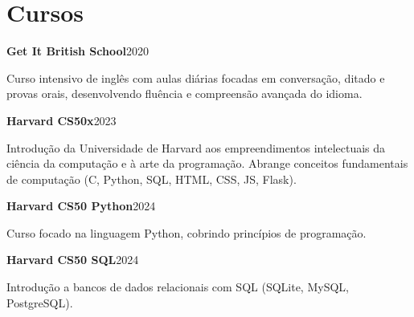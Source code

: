 
\iffalse
\section{Cursos}
    \resumeSubHeadingListStart

    \resumeProjectHeading
    {\textbf{Get It British School}}{2020}
    Curso intensivo de inglˆes com aulas diˊarias focadas em conversação, ditado e provas orais, desenvolvendo fluência e compreensão avanc¸ada do idioma.
    
    \resumeProjectHeading
    {\textbf{Harvard CS50x}}{2023}

    Introdução da Universidade de Harvard aos empreendimentos intelectuais da ciência da computação e à arte da programação. Abrange conceitos fundamentais, como algoritimos, estrutura de dados, gerenciamento de memória e desenvolvimento web (C, Python, SQL, HTML, CSS, JS, Flask).

    \resumeProjectHeading
    {\textbf{Harvard CS50 Python}}{2024}

    Curso focado na linguagem Python, cobrindo princípios de programação, tratamento de exceções, testes unitários, expressões regulares, manipulação de arquivos e boas práticas de desenvolvimento.

    \resumeProjectHeading
    {\textbf{Harvard CS50 SQL}}{2024}

     Introdução a bancos de dados relacionais com SQL, abordando modelagem, consultas avançadas, normalização, CRUD, otimização de desempenho e escalabilidade (SQLite, MySQL, PostgreSQL).
    
    \resumeSubHeadingListEnd
\fi

\section{Cursos}
    \resumeSubHeadingListStart

    \resumeProjectHeading
    {\textbf{Get It British School}}{2020}

    Curso intensivo de inglês com aulas diárias focadas em conversação, ditado e provas orais, desenvolvendo fluência e compreensão avançada do idioma.

    \resumeProjectHeading
    {\textbf{Harvard CS50x}}{2023}

    Introdução da Universidade de Harvard aos empreendimentos intelectuais da ciência da computação e à arte da programação. Abrange conceitos fundamentais de computação (C, Python, SQL, HTML, CSS, JS, Flask).

    \resumeProjectHeading
    {\textbf{Harvard CS50 Python}}{2024}

    Curso focado na linguagem Python, cobrindo princípios de programação.

    \resumeProjectHeading
    {\textbf{Harvard CS50 SQL}}{2024}

    Introdução a bancos de dados relacionais com SQL (SQLite, MySQL, PostgreSQL).
    
    \resumeSubHeadingListEnd